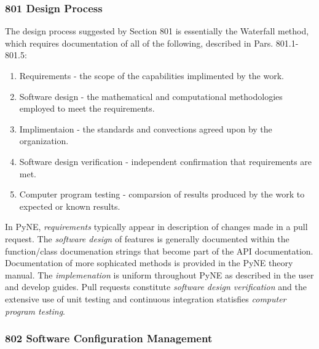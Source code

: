 \documentclass{anstrans}
\begin{document}
\subsubsection{801 Design Process}

The design process suggested by Section 801 is essentially the Waterfall method, which requires documentation of all of the following, described in Pars. 801.1-801.5:

\begin{enumerate} 
\item{Requirements - the scope of the capabilities implimented by the work.}
\item{Software design - the mathematical and computational methodologies employed to meet the requirements.}
\item{Implimentaion - the standards and convections agreed upon by the organization.}
\item{Software design verification - independent confirmation that requirements are met.}
\item{Computer program testing - comparsion of results produced by the work to expected or known results.}
\end{enumerate}

In PyNE, \emph{requirements} typically appear in description of changes made in
a pull request. The \emph{software design} of features is generally documented
within the function/class documenation strings that become part of the API
documentation. Documentation of more sophicated methods is provided in the PyNE
theory manual. The \emph{implemenation} is uniform throughout PyNE as described
in the user and develop guides. Pull requests constitute \emph{software design
verification} and the extensive use of unit testing and continuous integration
statisfies \emph{computer program testing}.


\subsubsection{802 Software Configuration Management}
\end{document}
